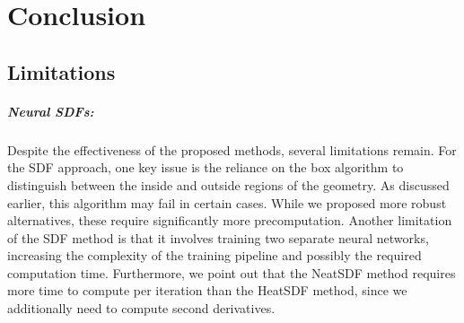\documentclass[12pt,openany]{book}
\theoremstyle{plainnormal}
\theoremstyle{remark}
\begin{document}

\clearpage
\chapter{Conclusion}
\begingroup
\let\clearpage\relax
\section{Limitations}
\paragraph{Neural SDFs:} Despite the effectiveness of the proposed methods, several limitations remain. For the SDF approach, one key issue is the reliance on the box algorithm to distinguish between the inside and outside regions of the geometry. As discussed earlier, this algorithm may fail in certain cases. While we proposed more robust alternatives, these require significantly more precomputation. Another limitation of the SDF method is that it involves training two separate neural networks, increasing the complexity of the training pipeline and possibly the required computation time. Furthermore, we point out that the NeatSDF method requires more time to compute per iteration than the HeatSDF method, since we additionally need to compute second derivatives.
\end{document}
